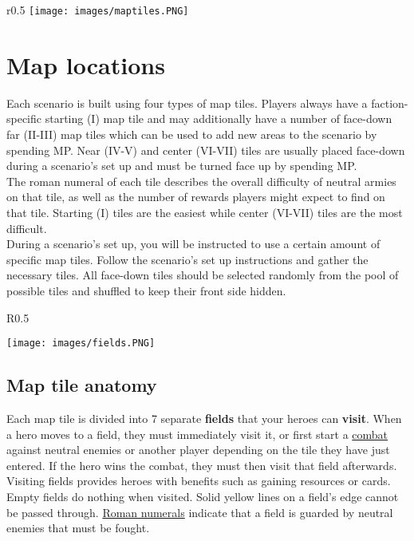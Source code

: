 \documentclass[12pt]{article}
\begin{document}
\clearpage

\begin{wrapfigure}{r}{0.5\textwidth}
\texttt{[image: images/maptiles.PNG]} 
\end{wrapfigure}
\section{Map locations}
Each scenario is built using four types of map tiles. Players always have a faction-specific starting (I) map tile and may additionally have a number of face-down far (II-III) map tiles which can be used to add new areas to the scenario by spending MP. Near (IV-V) and center (VI-VII) tiles are usually placed face-down during a scenario’s set up and must be turned face up by spending MP.\\[6pt]
The roman numeral of each tile describes the overall difficulty of neutral armies on that tile, as well as the number of rewards players might expect to find on that tile. Starting (I) tiles are the easiest while center (VI-VII) tiles are the most difficult.\\[6pt]
During a scenario’s set up, you will be instructed to use a certain amount of specific map tiles. Follow the scenario’s set up instructions and gather the necessary tiles. All face-down tiles should be selected randomly from the pool of possible tiles and shuffled to keep their front side hidden.\\[6pt]
\begin{wrapfigure}{R}{0.5\textwidth}
    \begin{center}
    \texttt{[image: images/fields.PNG]}
    \end{center}
\end{wrapfigure}
\subsection*{Map tile anatomy}
Each map tile is divided into 7 separate \textbf{fields} that your heroes can \textbf{visit}. When a hero moves to a field, they must immediately visit it, or 
first start a \hyperlink{Combat}{combat} against neutral enemies or another player depending on the tile they have just entered. If the hero wins the combat, they must then visit that field afterwards. Visiting fields provides heroes with benefits such as gaining resources or cards. Empty fields do nothing when visited. Solid yellow lines on a field's edge cannot be passed through. \hyperlink{Difficulty}{Roman numerals} indicate that a field is guarded by neutral enemies that must be fought.\\[6pt]
\end{document}
